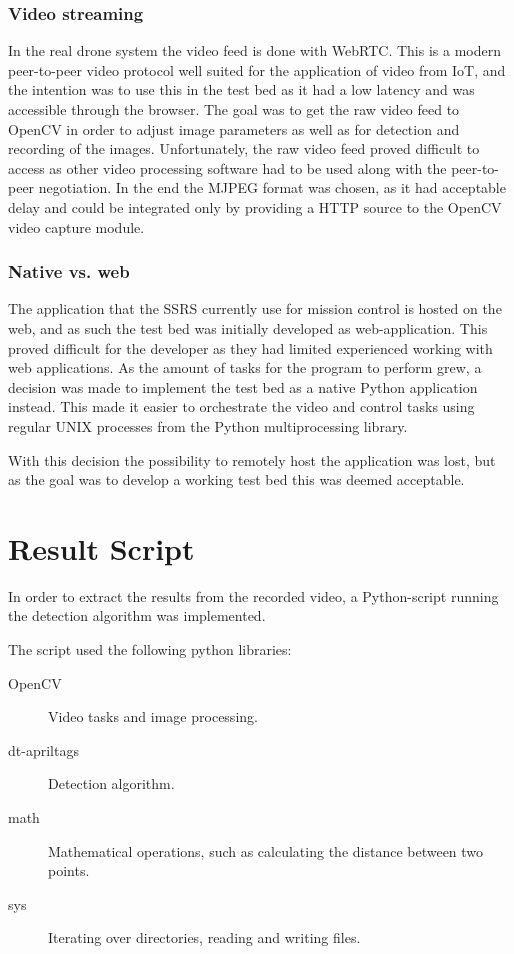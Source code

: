 \documentclass[nofilelist]{cslthse-msc}
\begin{document}
\subsubsection{Video streaming}
In the real drone system the video feed is done with WebRTC. This is a modern peer-to-peer video protocol well suited for the application of video from IoT, and the intention was to use this in the test bed as it had a low latency and was accessible through the browser. The goal was to get the raw video feed to OpenCV in order to adjust image parameters as well as for detection and recording of the images. Unfortunately, the raw video feed proved difficult to access as other video processing software had to be used along with the peer-to-peer negotiation. In the end the MJPEG format was chosen, as it had acceptable delay and could be integrated only by providing a HTTP source to the OpenCV video capture module.

\subsubsection{Native vs. web}
The application that the SSRS currently use for mission control is hosted on the web, and as such the test bed was initially developed as web-application. This proved difficult for the developer as they had limited experienced working with web applications. As the amount of tasks for the program to perform grew, a decision was made to implement the test bed as a native Python application instead. This made it easier to orchestrate the video and control tasks using regular UNIX processes from the Python multiprocessing library. 

With this decision the possibility to remotely host the application was lost, but as the goal was to develop a working test bed this was deemed acceptable. 

\section{Result Script}
\label{sec:resultscript}
In order to extract the results from the recorded video, a Python-script running the detection algorithm was implemented. 

The script used the following python libraries:
\begin{description}
   \item[OpenCV] Video tasks and image processing.
   \item[dt-apriltags] Detection algorithm.
   \item[math] Mathematical operations, such as calculating the distance between two points.
   \item[sys] Iterating over directories, reading and writing files.  
\end{description}
\end{document}
